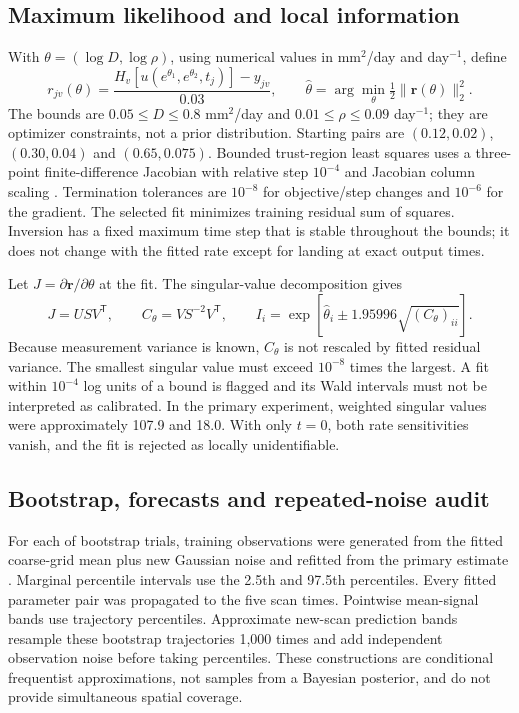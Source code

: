 \subsection{Maximum likelihood and local information}
With $\theta=(\log D,\log\rho)$, using numerical values in mm$^2$/day and day$^{-1}$, define
\begin{equation}
 r_{jv}(\theta)=\frac{H_v[u(e^{\theta_1},e^{\theta_2},t_j)]-y_{jv}}{0.03},\qquad
 \widehat\theta=\arg\min_\theta\tfrac12\|\bm r(\theta)\|_2^2.
\end{equation}
The bounds are $0.05\leq D\leq0.8$ mm$^2$/day and $0.01\leq\rho\leq0.09$ day$^{-1}$; they are optimizer constraints, not a prior distribution. Starting pairs are $(0.12,0.02)$, $(0.30,0.04)$ and $(0.65,0.075)$. Bounded trust-region least squares uses a three-point finite-difference Jacobian with relative step $10^{-4}$ and Jacobian column scaling \citep{virtanen2020}. Termination tolerances are $10^{-8}$ for objective/step changes and $10^{-6}$ for the gradient. The selected fit minimizes training residual sum of squares. Inversion has a fixed maximum time step that is stable throughout the bounds; it does not change with the fitted rate except for landing at exact output times.

Let $J=\partial\bm r/\partial\theta$ at the fit. The singular-value decomposition gives
\begin{equation}
 J=USV^{\mathsf T},\qquad C_\theta=VS^{-2}V^{\mathsf T},\qquad
 I_i=\exp\left[\widehat\theta_i\pm1.95996\sqrt{(C_\theta)_{ii}}\right].
\end{equation}
Because measurement variance is known, $C_\theta$ is not rescaled by fitted residual variance. The smallest singular value must exceed $10^{-8}$ times the largest. A fit within $10^{-4}$ log units of a bound is flagged and its Wald intervals must not be interpreted as calibrated. In the primary experiment, weighted singular values were approximately 107.9 and 18.0. With only $t=0$, both rate sensitivities vanish, and the fit is rejected as locally unidentifiable.

\subsection{Bootstrap, forecasts and repeated-noise audit}
For each of \RecoveryBootstraps{} bootstrap trials, training observations were generated from the fitted coarse-grid mean plus new Gaussian noise and refitted from the primary estimate \citep{efron1979}. Marginal percentile intervals use the 2.5th and 97.5th percentiles. Every fitted parameter pair was propagated to the five scan times. Pointwise mean-signal bands use trajectory percentiles. Approximate new-scan prediction bands resample these bootstrap trajectories 1,000 times and add independent observation noise before taking percentiles. These constructions are conditional frequentist approximations, not samples from a Bayesian posterior, and do not provide simultaneous spatial coverage.


